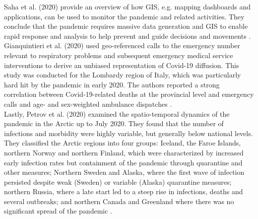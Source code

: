 Saha et al. (2020) provide an overview of how GIS, e.g. mapping dashboards and applications, can be used to monitor the pandemic and related activities. They conclude that the pandemic requires massive data generation and GIS to enable rapid response and analysis to help prevent and guide decisions and movements \autocite[][]{saha2020monitoring}. \\
Gianquintieri et al. (2020) used geo-referenced calls to the emergency number relevant to respiratory problems and subsequent emergency medical service interventions to derive an unbiased representation of Covid-19 diffusion. This study was conducted for the Lombardy region of Italy, which was particularly hard hit by the pandemic in early 2020. The authors reported a strong correlation between Covid-19-related deaths at the provincial level and emergency calls and age- and sex-weighted ambulance dispatches \autocite[][]{gianquintieri2020mapping}. \\
Lastly, Petrov et al. (2020) examined the spatio-temporal dynamics of the pandemic in the Arctic up to July 2020. They found that the number of infections and morbidity were highly variable, but generally below national levels. They classified the Arctic regions into four groups: Iceland, the Faroe Islands, northern Norway and northern Finland, which were characterized by increased early infection rates but containment of the pandemic through quarantine and other measures; Northern Sweden and Alaska, where the first wave of infection persisted despite weak (Sweden) or variable (Alaska) quarantine measures; northern Russia, where a late start led to a steep rise in infections, deaths and several outbreaks; and northern Canada and Greenland where there was no significant spread of the pandemic \autocite[][]{petrov2020spatiotemporal}.
